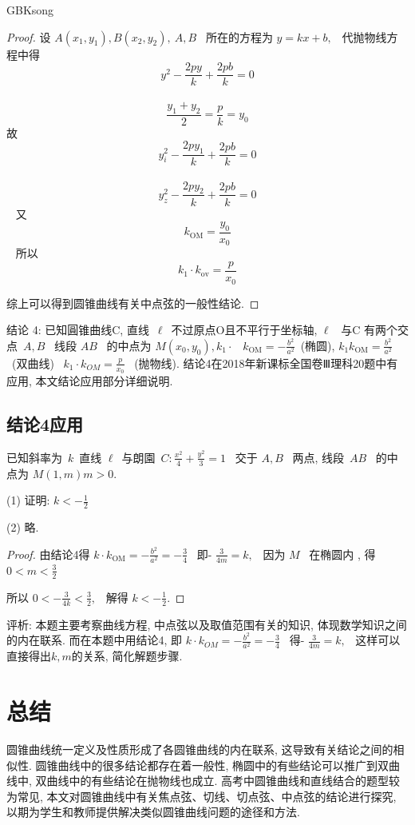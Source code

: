 \documentclass[a4paper, 12pt, twoside]{ctexart}
\begin{document}
\begin{CJK*}{GBK}{song}
    \begin{proof}
        设 $A(x_1, y_1),  B(x_2,y_2),  \ A,  B$~ 所在的方程为 $y=k x+b, $~ 代抛物线方程中得 
        $$~y^2-\frac{2 p y}{k}+\frac{2 p b}{k}=0~$$~
        $$\frac{y_{1}+y_{2}}{2}=\frac{p}{k}=y_0$$
    故
        $$~y_{i}^{2}-\frac{2 p y_{1}}{k}+\frac{2 p b}{k}=0~$$~
        $$~y_{z}^{2}-\frac{2 p y_{2}}{k}+\frac{2 p b}{k}=0~$$~
    又
        $$~k_{\mathrm{OM}}=\frac{y_0}{x_0}~$$~
    所以
        $$k_{1} \cdot k_{\mathrm{ov}}=\frac{p}{x_0}$$

    综上可以得到圆锥曲线有关中点弦的一般性结论.
    \end{proof}
    
    结论 4: 已知圓锥曲线C,  直线~$\ell$~不过原点O且不平行于坐标轴,  $\ell$~ 与C 有两个交点~$A,  B$~ 线段 $A B$~ 的中点为 $M(x_0, y_0),  k_{1} \cdot$~ $k_{\mathrm{OM}}=-\frac{b^2}{a^2}$~(椭圆),
 $k_{1} k_{\mathrm{OM}}=\frac{b^2}{a^2} $~(双曲线)
~$k_{1} \cdot k_{OM}=\frac{p}{x_0}$~ (抛物线).
 结论4在2018年新课标全国卷Ⅲ理科20题中有应用,  本文结论应用部分详细说明.
\subsection{结论4应用}
    \begin{exa}[2018年新课标全国卷Ⅲ理数第20题]
        已知斜率为~$k$~直线 $\ell$~与朗園~$C: \frac{x^2}{4}+\frac{y^2}{3}=1$~ 交于 $A,  B$~ 两点,  线段~$A B$~ 的中点为 $M(1, m)m>0$.
        
        (1) 证明:  $k<-\frac{1}{2}$~
        \par (2) 略.
    \end{exa}
    \begin{proof}由结论4得
 $k \cdot k_{\mathrm{OM}}=-\frac{b^2}{a^2}=-\frac{3}{4}$~
 即- $\frac{3}{4 m}=k, $~ 因为 $M$~ 在椭圆内 ,   得 $0<m<\frac{3}{2}$~
\par 所以 $0<-\frac{3}{4 k}<\frac{3}{2}, $~ 解得 $k<-\frac{1}{2}$.
\end{proof}

    评析: 本题主要考察曲线方程,  中点弦以及取值范围有关的知识,  体现数学知识之间的内在联系. 而在本题中用结论4,
即 $k \cdot k_{OM}=-\frac{b^2}{a^2}=-\frac{3}{4}$~
得- $\frac{3}{4 m}=k, $~
这样可以直接得出$k,m$的关系,  简化解题步骤.
\section{总结}
\par 圆锥曲线统一定义及性质形成了各圆锥曲线的内在联系,  这导致有关结论之间的相似性. 圆锥曲线中的很多结论都存在着一般性,  椭圆中的有些结论可以推广到双曲线中,  双曲线中的有些结论在抛物线也成立. 高考中圆锥曲线和直线结合的题型较为常见,  本文对圆锥曲线中有关焦点弦、切线、切点弦、中点弦的结论进行探究,  以期为学生和教师提供解决类似圆锥曲线问题的途径和方法.
\newpage


\end{CJK*}
\end{document}
